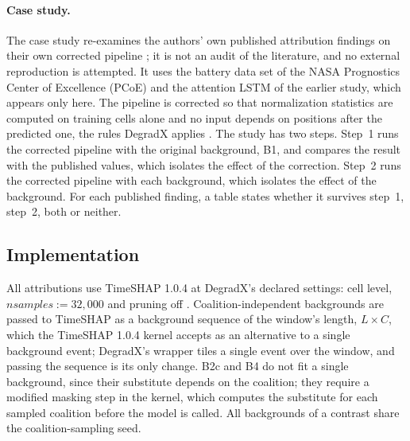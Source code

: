 \documentclass{article}
\begin{document}
\paragraph{Case study.} The case study re-examines the authors' own published attribution findings on their own corrected pipeline \citep{mishchuk2026explaining}; it is not an audit of the literature, and no external reproduction is attempted. It uses the battery data set of the NASA Prognostics Center of Excellence (PCoE) \citep{saha2007battery} and the attention LSTM of the earlier study, which appears only here. The pipeline is corrected so that normalization statistics are computed on training cells alone and no input depends on positions after the predicted one, the rules DegradX applies \citep{degradx2026}. The study has two steps. Step~1 runs the corrected pipeline with the original background, B1, and compares the result with the published values, which isolates the effect of the correction. Step~2 runs the corrected pipeline with each background, which isolates the effect of the background. For each published finding, a table states whether it survives step~1, step~2, both or neither.

\subsection{Implementation}\label{sec:method:impl}

All attributions use TimeSHAP 1.0.4 at DegradX's declared settings: cell level, $\textit{nsamples}:=32{,}000$ and pruning off \citep{bento2021timeshap, degradxrepo}. Coalition-independent backgrounds are passed to TimeSHAP as a background sequence of the window's length, $L\times C$, which the TimeSHAP 1.0.4 kernel accepts as an alternative to a single background event; DegradX's wrapper tiles a single event over the window, and passing the sequence is its only change. B2c and B4 do not fit a single background, since their substitute depends on the coalition; they require a modified masking step in the kernel, which computes the substitute for each sampled coalition before the model is called. All backgrounds of a contrast share the coalition-sampling seed.
\end{document}
